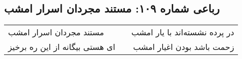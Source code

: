 \begin{center}
\section*{رباعی شماره ۱۰۹: مستند مجردان اسرار امشب}
\label{sec:0109}
\begin{longtable}{l p{0.5cm} r}
مستند مجردان اسرار امشب
&&
در پرده نشسته‌اند با یار امشب
\\
ای هستی بیگانه از این ره برخیز
&&
زحمت باشد بودن اغیار امشب
\\
\end{longtable}
\end{center}
